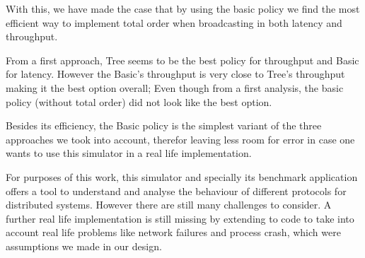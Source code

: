 \documentclass[a4paper, 11pt]{article}
\begin{document}
	With this, we have made the case that by using the basic policy we find the most efficient way to implement total order when broadcasting in both latency and throughput. 
	
	From a first approach, Tree seems to be the best policy for throughput and Basic for latency. However the Basic’s throughput is very close to Tree’s throughput making it the best option overall; Even though from a first analysis, the basic policy (without total order) did not look like the best option. 
	
	Besides its efficiency, the Basic policy is the simplest variant of the three approaches we took into account, therefor leaving less room for error in case one wants to use this simulator in a real life implementation. 
	
	For purposes of this work, this simulator and specially its benchmark application offers a tool to understand and analyse the behaviour of different protocols for distributed systems. However there are still many challenges to consider. A further real life implementation is still missing by extending to code to take into account real life problems like network failures and process crash, which were assumptions we made in our design. 
 
\end{document}
